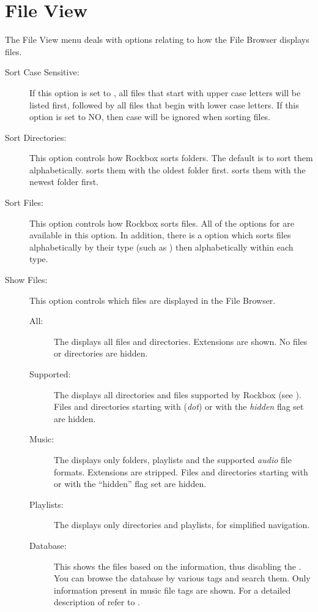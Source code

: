 \section{File View}
The File View menu deals with options relating to how the File Browser 
displays files.
%
\begin{description}
\item[Sort Case Sensitive:]
  If this option is set to , all files that start with upper case 
  letters will be listed first, followed by all files that begin with lower 
  case letters.  If this option is set to NO, then case will be ignored when 
  sorting files.
\item[Sort Directories:]
  This option controls how Rockbox sorts folders.  The default is to sort 
  them alphabetically.  sorts them with the oldest folder first. 
   sorts them with the newest folder first.
  
\item[Sort Files:]
  This option controls how Rockbox sorts files.  All of the options for 
   are available in this option.  In addition, there 
  is a  option which sorts files alphabetically by their type 
  (such as ) then alphabetically within each type.
  
\item[\label{ref:ShowFiles}Show Files:]
  This option controls which files are displayed in the File Browser.
  \begin{description}
  \item[All:] The  displays all files and directories.
    Extensions are shown. No files or directories are hidden.
  \item[Supported:] The  displays all directories and
    files supported by Rockbox (see ).
    Files and directories starting with  (\emph{dot}) or with the 
    \emph{hidden} flag set are hidden.
  \item[Music:] The  displays only folders, playlists and
    the supported \emph{audio} file formats. Extensions are stripped. Files and
    directories starting with  or with the ``hidden'' flag set are
    hidden.
  \item[Playlists:] The  displays only directories and playlists,
    for simplified navigation.
  \item[Database:] This shows the files based on the 
    information, thus disabling the . You can browse the
    database by various tags and search them. Only information present
    in music file tags are shown. For a detailed description of
     refer to .


\end{description}
\end{description}
